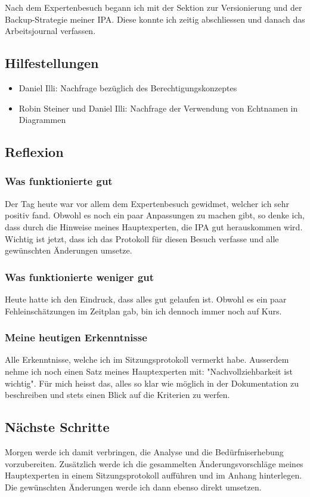 Nach dem Expertenbesuch begann ich mit der Sektion zur Versionierung und der Backup-Strategie meiner IPA. Diese konnte ich zeitig abschliessen und danach das Arbeitsjournal verfassen.

\subsection*{Hilfestellungen}
\begin{itemize}
    \item Daniel Illi: Nachfrage bezüglich des Berechtigungskonzeptes
    \item Robin Steiner und Daniel Illi: Nachfrage der Verwendung von Echtnamen in Diagrammen
\end{itemize}

\subsection*{Reflexion}

\subsubsection*{Was funktionierte gut}
Der Tag heute war vor allem dem Expertenbesuch gewidmet, welcher ich sehr positiv fand. Obwohl es noch ein paar Anpassungen zu
machen gibt, so denke ich, dass durch die Hinweise meines Hauptexperten, die IPA gut herauskommen wird. Wichtig ist jetzt, dass ich das 
Protokoll für diesen Besuch verfasse und alle gewünschten Änderungen umsetze. 

\subsubsection*{Was funktionierte weniger gut}
Heute hatte ich den Eindruck, dass alles gut gelaufen ist. Obwohl es ein paar Fehleinschätzungen im
Zeitplan gab, bin ich dennoch immer noch auf Kurs.

\subsubsection*{Meine heutigen Erkenntnisse}
Alle Erkenntnisse, welche ich im Sitzungsprotokoll vermerkt habe. Ausserdem nehme ich noch einen Satz meines Hauptexperten
mit: "Nachvollziehbarkeit ist wichtig". Für mich heisst das, alles so klar wie möglich in der Dokumentation zu beschreiben und 
stets einen Blick auf die Kriterien zu werfen.

\subsection*{Nächste Schritte}
Morgen werde ich damit verbringen, die Analyse und die Bedürfniserhebung vorzubereiten. Zusätzlich werde
ich die gesammelten Änderungsvorschläge meines Hauptexperten in einem Sitzungsprotokoll aufführen und im Anhang hinterlegen.
Die gewünschten Änderungen werde ich dann ebenso direkt umsetzen.

\pagebreak
